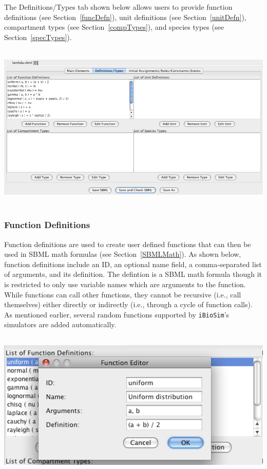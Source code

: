 \documentclass[titlepage,11pt]{article}
\begin{document}
\noindent
The Definitions/Types tab shown below allows users to provide 
function definitions (see Section~\ref{funcDefn}), 
unit definitions (see Section~\ref{unitDefn}), 
compartment types (see Section~\ref{compTypes}), and
species types (see Section~\ref{specTypes}).
\begin{center}
\includegraphics[height=80mm]{screenshots/DefnTypes}
\end{center}

\subsubsection{\label{funcDefn}Function Definitions}

\noindent
Function definitions are used to create user defined functions that
can then be used in SBML math formulas (see Section~\ref{SBMLMath}).  
As shown below, function definitions include an ID, an optional name field, a 
comma-separated list of arguments, and its definition.  The defintion 
is a SBML math formula though it is restricted to only use variable 
names which are arguments to the function.  While functions can
call other functions, they cannot be recursive (i.e., call themselves) 
either directly or indirectly (i.e., through a cycle of function calls).
As mentioned earlier, several random functions supported by 
{\tt iBioSim}'s simulators are added automatically.
\begin{center}
\includegraphics[height=70mm]{screenshots/function}
\end{center}
\end{document}
